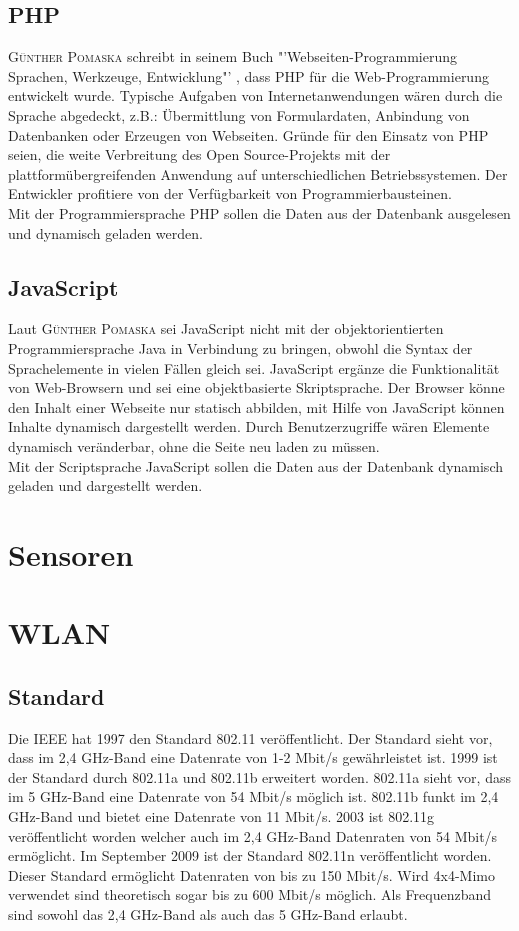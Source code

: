 \subsection{\ac{PHP}}
\textsc{Günther Pomaska} schreibt in seinem Buch "'Webseiten-Programmierung Sprachen, Werkzeuge, Entwicklung"' \cite{pomaska2012webseiten-programmierung}, dass \ac{PHP} für die Web-Programmierung entwickelt wurde. Typische Aufgaben von Internetanwendungen wären durch die Sprache abgedeckt, z.B.: Übermittlung von Formulardaten, Anbindung von Datenbanken oder Erzeugen von Webseiten. Gründe für den Einsatz von \ac{PHP} seien, die weite Verbreitung des Open Source-Projekts mit der plattformübergreifenden Anwendung auf unterschiedlichen Betriebssystemen. Der Entwickler profitiere von der Verfügbarkeit von Programmierbausteinen.\\
Mit der Programmiersprache \ac{PHP} sollen die Daten aus der Datenbank ausgelesen und dynamisch geladen werden.

\subsection{JavaScript}
Laut \textsc{Günther Pomaska} \cite{pomaska2012webseiten-programmierung} sei JavaScript nicht mit der objektorientierten Programmiersprache Java in Verbindung zu bringen, obwohl die Syntax der Sprachelemente in vielen Fällen gleich sei. JavaScript ergänze die Funktionalität von Web-Browsern und sei eine objektbasierte Skriptsprache. Der Browser könne den Inhalt einer Webseite nur statisch abbilden, mit Hilfe von JavaScript können Inhalte dynamisch dargestellt werden. Durch Benutzerzugriffe wären Elemente dynamisch veränderbar, ohne die Seite neu laden zu müssen.\\
Mit der Scriptsprache JavaScript sollen die Daten aus der Datenbank dynamisch geladen und dargestellt werden.

\section{Sensoren}\label{Sensoren_Planung}


\section{WLAN}
\subsection{Standard}
Die \ac{IEEE} hat 1997 den Standard 802.11 veröffentlicht. Der Standard sieht vor, dass im 2,4 GHz-Band eine Datenrate von 1-2 Mbit/s gewährleistet ist. 1999 ist der Standard durch 802.11a und 802.11b erweitert worden. 802.11a sieht vor, dass im 5 GHz-Band eine Datenrate von 54 Mbit/s möglich ist. 802.11b funkt im 2,4 GHz-Band und bietet eine Datenrate von 11 Mbit/s. 2003 ist 802.11g veröffentlicht worden welcher auch im 2,4 GHz-Band Datenraten von 54 Mbit/s ermöglicht. Im September 2009 ist der Standard 802.11n veröffentlicht worden. Dieser Standard ermöglicht Datenraten von bis zu 150 Mbit/s. Wird 4x4-Mimo verwendet sind theoretisch sogar bis zu 600 Mbit/s möglich. Als Frequenzband sind sowohl das 2,4 GHz-Band als auch das 5 GHz-Band erlaubt.
 

